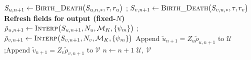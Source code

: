\documentclass[a4paper,fleqn]{cas-sc}
\theoremstyle{definition}
\theoremstyle{remark}
\begin{document}
\begin{algorithm}
\begin{algorithmic}
    \State $S_{u,n+1} \gets \textsc{Birth\_Death}\big(S_{u,n,*},\tau,r_u\big)$
    ; $S_{v,n+1} \gets \textsc{Birth\_Death}\big(S_{v,n,*},\tau,r_v\big)$
    \State \textbf{Refresh fields for output (fixed-$N$)}
    \State $\tilde\rho_{u,n+1} \gets \textsc{Interp}\big(S_{u,n+1},N_u,\mathcal M_K,\{\psi_m\}\big)$
    ; $\tilde\rho_{v,n+1} \gets \textsc{Interp}\big(S_{v,n+1},N_v,\mathcal M_K,\{\psi_m\}\big)$
    \State Append $\tilde u_{n+1}=Z_u\tilde\rho_{u,n+1}$ to $\mathcal U$;\quad Append $\tilde v_{n+1}=Z_v\tilde\rho_{v,n+1}$ to $\mathcal V$
    \State $n\gets n+1$
  \EndWhile
  \State \Return $\mathcal U,\ \mathcal V$
\EndProcedure
\end{algorithmic}
\end{algorithm}





\end{document}
